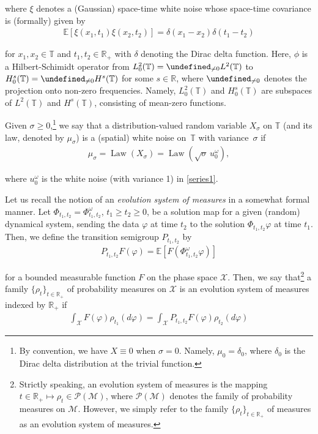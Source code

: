 \documentclass[letterpaper, 11pt,  reqno]{amsart}
\DeclareMathOperator{\Law}{Law}
\newcommand{\1}{\hspace{0.5mm}\text{I}\hspace{0.5mm}}
\newcommand{\noi}{\noindent}
\newcommand{\R}{\mathbb{R}}
\newcommand{\T}{\mathbb{T}}
\let\P= \undefined
\newcommand{\P}{\mathbf{P}}
\newcommand{\E}{\mathbb{E}}
\newcommand{\dl}{\delta}
\newcommand{\s}{\sigma}
\renewcommand{\o}{\omega}
\newcommand{\M}{\mathcal{M}}
\numberwithin{equation}{section}
\numberwithin{theorem}{section}
\begin{document}
\noi
where $\xi$ denotes a (Gaussian) space-time white noise 
whose space-time covariance is (formally) given by 
\begin{align*}
 \E[ \xi(x_1, t_1)\xi(x_2, t_2) ] = \dl(x_1 - x_2) \dl (t_1 - t_2)
\end{align*} 

\noi
for $x_1, x_2 \in \T$ and $t_1, t_2 \in \R_+$ 
with $\dl$ denoting the Dirac delta function.
Here, 
$\phi$ is a Hilbert-Schimidt operator from $L^2_0(\T) = \P_{\ne 0}L^2(\T)$ to 
$H_0^s(\T)= \P_{\ne 0}H^s(\T)$
for some $s \in \R$, 
where $\P_{\ne 0}$ denotes the projection onto non-zero frequencies.
Namely, 
$L^2_0(\T)$
and $H_0^s(\T)$
are subspaces of $L^2(\T)$ and $H^s(\T)$, 
consisting of mean-zero functions.





Given $\s \ge 0$,\footnote{By convention, we have $X\equiv 0$ when $\s = 0$.
Namely, $\mu_0 = \dl_0$, where $\dl_0$ is the Dirac delta distribution at the trivial function.} we say that a distribution-valued random variable $X_\s$ on $\T$ (and its law, denoted by $\mu_\s$)
is a (spatial) white noise on~$\T$ with variance~$\s$ if
\begin{align}
 \mu_{\s} = \Law(X_\s) = \Law (\sqrt \s\, u_0^\o),
 \label{mu1}
\end{align}

\noi
where $u_0^\o$ is the white noise (with variance 1) in \eqref{series1}.


Let us recall the notion of 
 an {\it evolution system of measures} \cite{DR, DD}
 in a somewhat formal manner.
Let $\Phi_{t_1, t_2}= \Phi_{t_1, t_2}^\o$, $t_1 \ge t_2 \ge 0$,  
be a solution map for a given  (random) dynamical system, 
sending the data $\varphi$ at time $t_2$ to the solution $\Phi_{t_1, t_2}\varphi$ at time $t_1$.
Then, we define the transition semigroup $P_{t_1, t_2}$
by 
\begin{align}
 P_{t_1, t_2}F(\varphi) = \E[ F(\Phi_{t_1, t_2}^\o \varphi)]
\label{trans1}
\end{align} 

\noi
for a bounded measurable function $F$ on the phase space $\mathcal{X}$.
Then, we say that\footnote{Strictly speaking, an evolution system of measures
is the mapping $t \in \R_+ \mapsto \rho_t \in \mathcal{P}(\M)$, 
where $\mathcal{P}(\M)$ denotes the family of probability measures on $\M$.
However, we simply refer to the family $\{\rho_t\}_{t \in \R_+}$ of measures
as an evolution system of measures.} 
a family $\{\rho_t\}_{t \in \R_+}$ of probability measures on $\mathcal{X}$
is an evolution system of measures indexed by $\R_+$ if
\begin{align}
\int_\mathcal{X}  F(\varphi) \rho_{t_1}(d\varphi)= 
 \int_\mathcal{X} P_{t_1, t_2} F(\varphi) \rho_{t_2}(d\varphi)
 \label{evo1}
\end{align}
\end{document}
